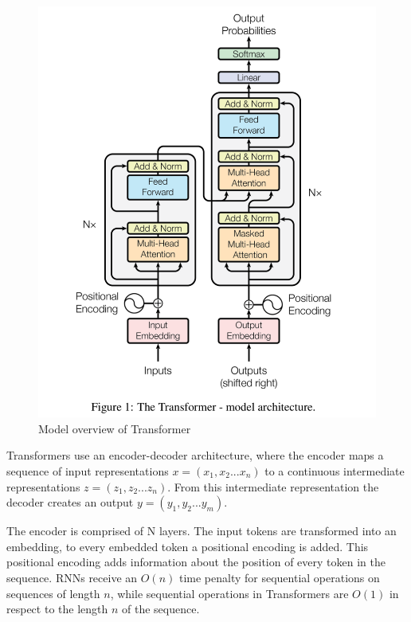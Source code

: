 \label{fig:transformers}
\begin{figure}[H]
  \centering
  \includegraphics[width=\linewidth]{img/transformer.png}
  \caption{Model overview of Transformer \cite{Transformers}}
\end{figure}

Transformers use an encoder-decoder architecture, where the encoder maps a sequence of input representations \(x = (x_1,x_2 ... x_n)\) to a continuous intermediate representations \(z = (z_1,z_2 ... z_n)\). From this intermediate representation the decoder creates an output \(y = (y_1,y_2 ... y_m)\).

The encoder is comprised of N layers. The input tokens are transformed into an embedding, to every embedded token a positional encoding is added. This positional encoding adds information about the position of every token in the sequence. RNNs receive an \(O(n)\) time penalty for sequential operations on sequences of length \(n\), while sequential operations in Transformers are \(O(1)\) in respect to the length \(n\) of the sequence.

